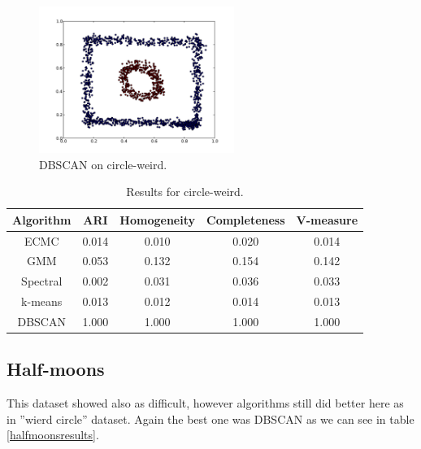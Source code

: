 \documentclass[conference]{IEEEtran}
\begin{document}
\begin{figure}[th]
\centering
\includegraphics[width=15pc]{dbscan_circle-weird.pdf}
\caption{DBSCAN on circle-weird.}
\label{DBSCAN_circleweird}
\end{figure}

\begin{table}[htbp]
\caption{Results for circle-weird.}
\label{circleweirdresults}
\begin{center}
\setlength{\tabcolsep}{3pt}
\begin{tabular}{ |c|c|c|c|c| }
\hline
	Algorithm & ARI & Homogeneity & Completeness & V-measure\\ \hline
	
	ECMC & 0.014 & 0.010 & 0.020 & 0.014 \\ \hline
	GMM & 0.053 & 0.132 & 0.154 & 0.142 \\ \hline
	Spectral & 0.002 & 0.031 & 0.036 & 0.033 \\ \hline
	k-means & 0.013 & 0.012 & 0.014 & 0.013 \\ \hline
	DBSCAN & 1.000 & 1.000 & 1.000 & 1.000 \\ \hline
\end{tabular}
\end{center}
\end{table}


\subsection{Half-moons}

This dataset showed also as difficult, however algorithms still did better here as in ''wierd circle'' dataset. Again
the best one was DBSCAN as we can see in table \ref{halfmoonsresults}. 
\end{document}
